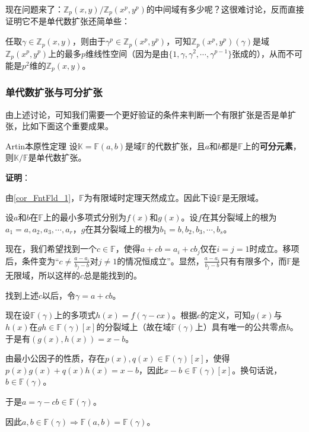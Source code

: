 现在问题来了：$\mathbb{Z}_p(x, y)/\mathbb{Z}_p(x^p, y^p)$的中间域有多少呢？这很难讨论，反而直接证明它不是单代数扩张还简单些：

任取$\gamma\in\mathbb{Z}_p(x, y)$，则由于$\gamma^p\in\mathbb{Z}_p(x^p, y^p)$，可知$\mathbb{Z}_p(x^p, y^p)(\gamma)$是域$\mathbb{Z}_p(x^p, y^p)$上的最多$p$维线性空间（因为是由$\{1,\gamma, \gamma^2, \cdots, \gamma^{p-1}\}$张成的），从而不可能是$p^2$维的$\mathbb{Z}_p(x, y)$。


\subsubsection{单代数扩张与可分扩张}

由上述讨论，可知我们需要一个更好验证的条件来判断一个有限扩张是否是单扩张，比如下面这个重要成果。

\begin{theorem}{Artin本原性定理}\label{the_PrmtEl_2}
设$\mathbb{K}=\mathbb{F}(a, b)$是域$\mathbb{F}$的代数扩张，且$a$和$b$都是$\mathbb{F}$上的\textbf{可分元素}，则$\mathbb{K}/\mathbb{F}$是单代数扩张。
\end{theorem}

\textbf{证明}：

由\autoref{cor_FntFld_1}，$\mathbb{F}$为有限域时定理天然成立。因此下设$\mathbb{F}$是无限域。

设$a$和$b$在$\mathbb{F}$上的最小多项式分别为$f(x)$和$g(x)$。设$f$在其分裂域上的根为$a_1=a, a_2, a_3, \cdots, a_r$，$g$在其分裂域上的根为$b_1=b, b_2, b_3, \cdots, b_s$。

现在，我们希望找到一个$c\in\mathbb{F}$，使得$a+cb=a_i+cb_j$仅在$i=j=1$时成立。移项后，条件变为“$c\neq\frac{a-a_i}{b_j-b}$对$j\neq 1$的情况恒成立”。显然，$\frac{a-a_i}{b_j-b}$只有有限多个，而$\mathbb{F}$是无限域，所以这样的$c$总是能找到的。

找到上述$c$以后，令$\gamma=a+cb$。

现在设$\mathbb{F}(\gamma)$上的多项式$h(x)=f(\gamma-cx)$。根据$c$的定义，可知$g(x)$与$h(x)$在$gh\in\mathbb{F}(\gamma)[x]$的分裂域上（故在域$\mathbb{F}(\gamma)$上）具有唯一的公共零点$b$。于是有$(g(x), h(x))=x-b$。

由最小公因子的性质，存在$p(x), q(x)\in\mathbb{F}(\gamma)[x]$，使得$p(x)g(x)+q(x)h(x)=x-b$，因此$x-b\in\mathbb{F}(\gamma)[x]$。换句话说，$b\in\mathbb{F}(\gamma)$。

于是$a=\gamma-cb\in\mathbb{F}(\gamma)$。

因此$a, b\in\mathbb{F}(\gamma)\Rightarrow \mathbb{F}(a, b)=\mathbb{F}(\gamma)$。

